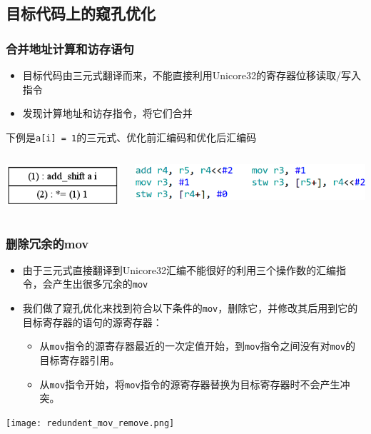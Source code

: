 \documentclass{beamer}
\begin{document}
\subsection{目标代码上的窥孔优化}
\begin{frame}
	\frametitle{合并地址计算和访存语句}
	\begin{itemize}
		\item 目标代码由三元式翻译而来，不能直接利用Unicore32的寄存器位移读取/写入指令
		\item 发现计算地址和访存指令，将它们合并
	\end{itemize}
	下例是\lstinline|a[i] = 1|的三元式、优化前汇编码和优化后汇编码
	\begin{columns}
		\begin{center}
			\includegraphics[scale=0.4]{ldst_peephole_triple.png}
		\end{center}
			\includegraphics[scale=0.4]{ldst_peephole_example.png}
	\end{columns}
\end{frame}

\begin{frame}
	\frametitle{删除冗余的mov}
	\begin{itemize}
		\item 由于三元式直接翻译到Unicore32汇编不能很好的利用三个操作数的汇编指令，会产生出很多冗余的\lstinline|mov|
		\item 我们做了窥孔优化来找到符合以下条件的\lstinline|mov|，删除它，并修改其后用到它的目标寄存器的语句的源寄存器：
		\begin{itemize}
			\item 从\lstinline|mov|指令的源寄存器最近的一次定值开始，到\lstinline|mov|指令之间没有对\lstinline|mov|的目标寄存器引用。
			\item 从\lstinline|mov|指令开始，将\lstinline|mov|指令的源寄存器替换为目标寄存器时不会产生冲突。
		\end{itemize}
	\end{itemize}
	
	\begin{center}
	\texttt{[image: redundent\_mov\_remove.png]}
	
	\end{center}
\end{frame}
\end{document}
